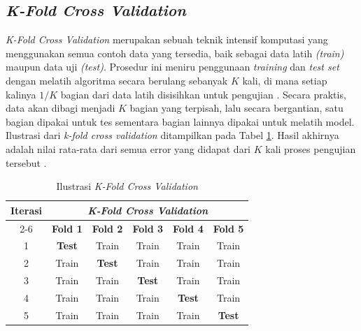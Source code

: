 

\subsection{\textit{K-Fold Cross Validation}} \label{II.TeoriKFold}
\textit{K-Fold Cross Validation} merupakan sebuah teknik intensif komputasi yang menggunakan semua contoh data yang tersedia, baik sebagai data latih \textit{(train)} maupun data uji \textit{(test)}. Prosedur ini meniru penggunaan \textit{training} dan \textit{test set} dengan melatih algoritma secara berulang sebanyak $K$ kali, di mana setiap kalinya $1/K$ bagian dari data latih disisihkan untuk pengujian \cite{kfold}. Secara praktis, data akan dibagi menjadi $K$ bagian yang terpisah, lalu secara bergantian, satu bagian dipakai untuk tes sementara bagian lainnya dipakai untuk melatih model. Ilustrasi dari \textit{k-fold cross validation} ditampilkan pada Tabel \ref{table:2.KFold}. Hasil akhirnya adalah nilai rata-rata dari semua error yang didapat dari $K$ kali proses pengujian tersebut \cite{kfold}. \par

\begin{table}[H]
\centering
\caption{Ilustrasi \textit{K-Fold Cross Validation}}
\label{table:2.KFold}
\begin{tabular}{|c|c|c|c|c|c|}
\hline
\multirow{2}{*}{\textbf{Iterasi}} & \multicolumn{5}{c|}{\textbf{\textit{K-Fold Cross Validation}}} \\
\cline{2-6}
& \textbf{Fold 1} & \textbf{Fold 2} & \textbf{Fold 3} & \textbf{Fold 4} & \textbf{Fold 5} \\
\hline
1 & \cellcolor{blue!20}\textbf{Test} & Train & Train & Train & Train \\
\hline
2 & Train & \cellcolor{blue!20}\textbf{Test} & Train & Train & Train \\
\hline
3 & Train & Train & \cellcolor{blue!20}\textbf{Test} & Train & Train \\
\hline
4 & Train & Train & Train & \cellcolor{blue!20}\textbf{Test} & Train \\
\hline
5 & Train & Train & Train & Train & \cellcolor{blue!20}\textbf{Test} \\
\hline
\end{tabular}
\end{table}

